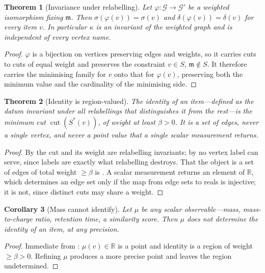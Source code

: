 \documentclass[11pt,a4paper]{article}
\newtheorem{theorem}{Theorem}[section]
\newtheorem{corollary}[theorem]{Corollary}
\theoremstyle{definition}
\theoremstyle{remark}
\newcommand{\Gph}{\mathcal{G}}              %
\newcommand{\med}{\mathfrak{m}}              %
\newcommand{\flo}{\beta}                     %
\newcommand{\cut}{\operatorname{cut}}
\newcommand{\sep}{\sigma}                    %
\newcommand{\dep}{\delta}                    %
\newcommand{\key}{\kappa}                    %
\begin{document}
\begin{theorem}[Invariance under relabelling]
\label{thm:invariance}
Let $\varphi:\Gph\to\Gph'$ be a weighted isomorphism fixing $\med$. Then
$\sep(\varphi(v))=\sep(v)$ and $\dep(\varphi(v))=\dep(v)$ for every
item $v$. In particular $\key$ is an invariant of the weighted graph and
is independent of every vertex name.
\end{theorem}

\begin{proof}
$\varphi$ is a bijection on vertices preserving edges and weights, so it
carries cuts to cuts of equal weight and preserves the constraint
$v\in S$, $\med\notin S$. It therefore carries the minimising family for
$v$ onto that for $\varphi(v)$, preserving both the minimum value and the
cardinality of the minimising side.
\end{proof}

\begin{theorem}[Identity is region-valued]
\label{thm:region}
The identity of an item---defined as the datum invariant under all
relabellings that distinguishes it from the rest---is the minimum cut
$\cut(S^{\ast}(v))$, of weight at least $\flo>0$. It is a set of edges,
never a single vertex, and never a point value that a single scalar
measurement returns.
\end{theorem}

\begin{proof}
By  the cut and its weight are relabelling
invariants; by  no vertex label can serve, since
labels are exactly what relabelling destroys. That the object is a set of
edges of total weight $\ge\flo$ is . A scalar
measurement returns an element of $\mathbb{R}$, which determines an edge
set only if the map from edge sets to reals is injective; it is not,
since distinct cuts may share a weight.
\end{proof}

\begin{corollary}[Mass cannot identify]
\label{cor:mass}
Let $\mu$ be any scalar observable---mass, mass-to-charge ratio,
retention time, a similarity score. Then $\mu$ does not determine the
identity of an item, at any precision.
\end{corollary}

\begin{proof}
Immediate from : $\mu(v)\in\mathbb{R}$ is a point and
identity is a region of weight $\ge\flo>0$. Refining $\mu$ produces a
more precise point and leaves the region undetermined.
\end{proof}
\end{document}
